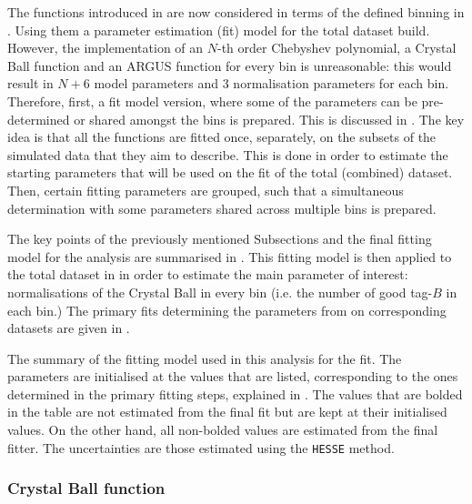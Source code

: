 The functions introduced in  are now considered in terms of the defined binning in .
Using them a \Mbc parameter estimation (fit) model for the total dataset build.
However, the implementation of an $N$-th order Chebyshev polynomial, a Crystal Ball function and an ARGUS function for every \EB bin is unreasonable:
this would result in $N+6$ model parameters and 3 normalisation parameters for each bin.
Therefore, first, a fit model version, where some of the parameters can be pre-determined or shared amongst the bins is prepared.
This is discussed in .
The key idea is that all the functions are fitted once, separately, on the subsets of the simulated data that they aim to describe.
This is done in order to estimate the starting parameters that will be used on the fit of the total (combined) dataset.
Then, certain fitting parameters are grouped, such that a simultaneous determination with some parameters shared across multiple bins is prepared.

The key points of the previously mentioned Subsections and the final fitting model for the analysis are summarised in .
This fitting model is then applied to the total dataset in  in order to estimate the main parameter of interest: normalisations of the Crystal Ball in every \EB bin (i.e. the number of good tag-$B$ in each \EB bin.)
The primary \Mbc fits determining the parameters from  on corresponding datasets are given in . 

\begin{table}[htbp!]
    \centering
    \caption{\label{tab:fitting_init_params} The summary of the fitting model used in this analysis for the \Mbc fit.
    The parameters are initialised at the values that are listed, corresponding to the ones determined in the primary fitting steps, explained in .
    The values that are bolded in the table are not estimated from the final \Mbc fit but are kept at their initialised values.
    On the other hand, all non-bolded values are estimated from the final fitter.
    The uncertainties are those estimated using the \texttt{HESSE} method.
    }

\end{table}

\subsubsection{Crystal Ball function}\label{sec:crystal_ball_prefit}

